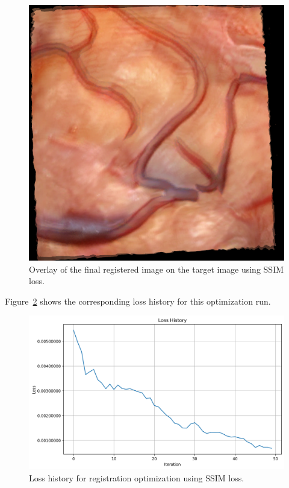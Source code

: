 \begin{figure}[htpb]
  \centering
  \includegraphics[scale=0.5]{figures/ssim/alignment_overlay.png}
  \caption[Registration result with SSIM loss]{Overlay of the final registered image on the target image using SSIM loss.}
  \label{fig:ssim_overlay}
\end{figure}

Figure~\ref{fig:ssim_history} shows the corresponding loss history for this optimization run.

\begin{figure}[htpb]
  \centering
  \includegraphics[scale=0.65]{figures/ssim/loss_history.png}
  \caption[Loss history for SSIM optimization]{Loss history for registration optimization using SSIM loss.}
  \label{fig:ssim_history}
\end{figure}

